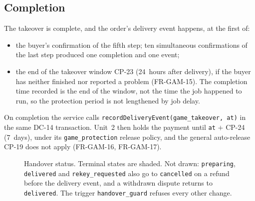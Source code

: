 \documentclass[11pt,a4paper]{article}
\begin{document}
\subsection{Completion}
The takeover is complete, and the order's delivery event happens, at the first of:
\begin{itemize}[nosep]
  \item the buyer's confirmation of the fifth step; ten simultaneous confirmations of the last step produced one completion and one event;
  \item the end of the takeover window CP-23 (24~hours after delivery), if the buyer has neither finished nor reported a problem (FR-GAM-15). The completion time recorded is the end of the window, not the time the job happened to run, so the protection period is not lengthened by job delay.
\end{itemize}
On completion the service calls \texttt{recordDeliveryEvent(game\_takeover, at)} in the same DC-14 transaction. Unit~2 then holds the payment until \texttt{at} $+$ CP-24 (7~days), under its \texttt{game\_protection} release policy, and the general auto-release CP-19 does not apply (FR-GAM-16, FR-GAM-17).

\begin{figure}[!htbp]
\centering
{}
\caption{Handover status. Terminal states are shaded. Not drawn: \texttt{preparing}, \texttt{delivered} and \texttt{rekey\_requested} also go to \texttt{cancelled} on a refund before the delivery event, and a withdrawn dispute returns to \texttt{delivered}. The trigger \texttt{handover\_guard} refuses every other change.}
\label{fig:states}
\end{figure}
\end{document}
